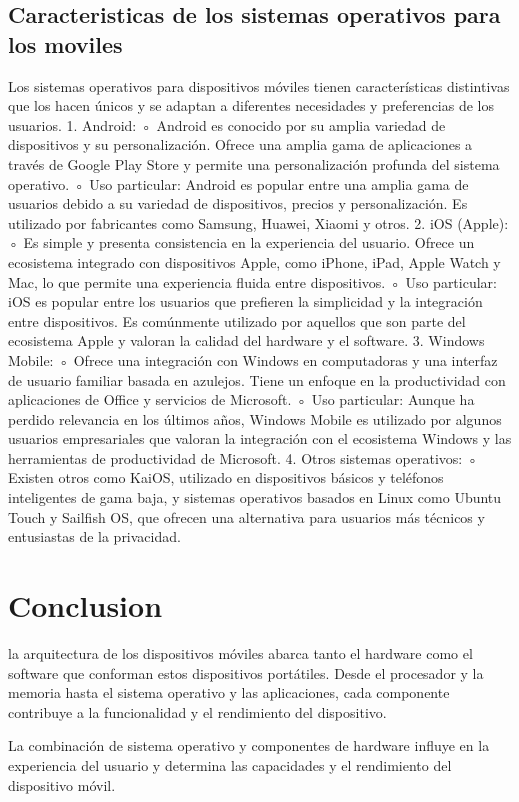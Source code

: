 \documentclass{article}
\begin{document}
\begin{multicols}{2}
		\subsection{Caracteristicas de los sistemas operativos para los moviles}
		Los sistemas operativos para dispositivos móviles tienen características distintivas que los hacen únicos y se adaptan a diferentes necesidades y preferencias de los usuarios. 
		1. Android:
		◦ Android es conocido por su amplia variedad de dispositivos y su personalización. Ofrece una amplia gama de aplicaciones a través de Google Play Store y permite una personalización profunda del sistema operativo.
		◦ Uso particular: Android es popular entre una amplia gama de usuarios debido a su variedad de dispositivos, precios y personalización. Es utilizado por fabricantes como Samsung, Huawei, Xiaomi y otros.
		2. iOS (Apple):
		◦ Es simple y presenta consistencia en la experiencia del usuario. Ofrece un ecosistema integrado con dispositivos Apple, como iPhone, iPad, Apple Watch y Mac, lo que permite una experiencia fluida entre dispositivos.
		◦ Uso particular: iOS es popular entre los usuarios que prefieren la simplicidad y la integración entre dispositivos. Es comúnmente utilizado por aquellos que son parte del ecosistema Apple y valoran la calidad del hardware y el software.
		3. Windows Mobile:
		◦ Ofrece una integración con Windows en computadoras y una interfaz de usuario familiar basada en azulejos. Tiene un enfoque en la productividad con aplicaciones de Office y servicios de Microsoft.
		◦ Uso particular: Aunque ha perdido relevancia en los últimos años, Windows Mobile es utilizado por algunos usuarios empresariales que valoran la integración con el ecosistema Windows y las herramientas de productividad de Microsoft.
		4. Otros sistemas operativos:
		◦ Existen otros como KaiOS, utilizado en dispositivos básicos y teléfonos inteligentes de gama baja, y sistemas operativos basados en Linux como Ubuntu Touch y Sailfish OS, que ofrecen una alternativa para usuarios más técnicos y entusiastas de la privacidad.
		
		
		\section{Conclusion}
		la arquitectura de los dispositivos móviles abarca tanto el hardware como el software que conforman estos dispositivos portátiles. Desde el procesador y la memoria hasta el sistema operativo y las aplicaciones, cada componente contribuye a la funcionalidad y el rendimiento del dispositivo. 
		
		La combinación de sistema operativo y componentes de hardware influye en la experiencia del usuario y determina las capacidades y el rendimiento del dispositivo móvil.
		
	\end{multicols} 
\end{document}
